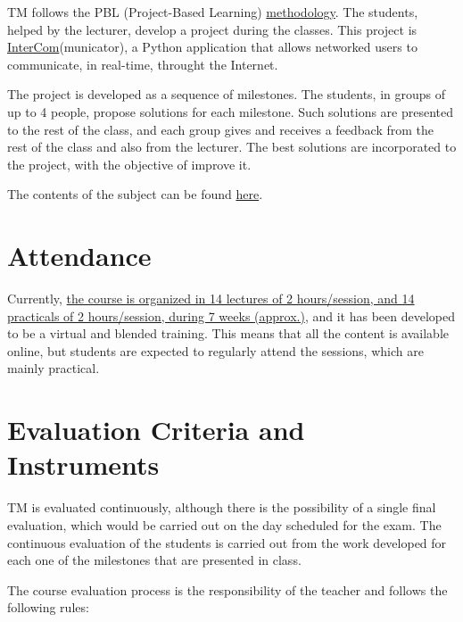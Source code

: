 TM follows the PBL (Project-Based Learning)
\href{http://portafirma.ual.es/pfirma/downloadReport/file?idDocument=4u61Ie5es2&idRequest=ZeBY35LlFa}{methodology}. The
students, helped by the lecturer, develop a project during the
classes. This project is
\href{https://github.com/Tecnologias-multimedia/intercom}{InterCom}(municator),
a Python application that allows networked users to communicate, in
real-time, throught the Internet.

The project is developed as a sequence of milestones. The students, in
groups of up to 4 people, propose solutions for each milestone. Such
solutions are presented to the rest of the class, and each group gives
and receives a feedback from the rest of the class and also from the
lecturer. The best solutions are incorporated to the project, with the
objective of improve it.

The contents of the subject can be found \href{https://tecnologias-multimedia.github.io/contents/}{here}.

\section{Attendance}

Currently,
\href{https://www.ual.es/estudios/grados/presentacion/plandeestudios/asignatura/4015/40154321}{the
  course is organized in 14 lectures of 2 hours/session, and 14
  practicals of 2 hours/session, during 7 weeks (approx.)}, and it
has been developed to be a virtual and blended training. This means
that all the content is available online, but students are expected to
regularly attend the sessions, which are mainly practical.

\section{Evaluation Criteria and Instruments}

TM is evaluated continuously, although there is the possibility of a
single final evaluation, which would be carried out on the day
scheduled for the exam. The continuous evaluation of the students is
carried out from the work developed for each one of the milestones
that are presented in class.

The course evaluation process is the responsibility of the teacher and
follows the following rules:

